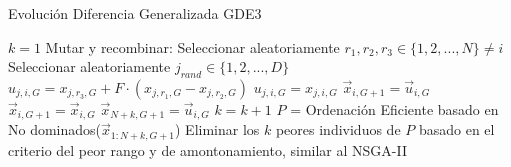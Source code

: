 \begin{algorithm}[H]
\caption{Evolución Diferencia Generalizada GDE3}
\scriptsize
\label{alg:GDE3}
\begin{scriptsize}
\begin{algorithmic}[1]
	\STATE $k=1$
    	\STATE Mutar y recombinar:
    	      \STATE Seleccionar aleatoriamente $r_1, r_2, r_3 \in \{ 1,2, ..., N \} \neq i$
    	      \STATE Seleccionar aleatoriamente $j_{rand} \in \{1, 2, ..., D \}$
    	 	       \IF{$rand_j[0,1) < CR \lor j == j_{rand}$} 
    		      		\STATE $u_{j,i, G}=x_{j,r_3, G} + F \cdot (x_{j, r_1, G} - x_{j, r_2, G})$
    	   	  	 	\ELSE
    	      			\STATE   $u_{j,i, G}= x_{j,i,G}$
    	   		   \ENDIF
    	      \ENDFOR
    	         \STATE $\vec{x}_{i, G+1 } =\vec{u}_{i,G}$ 
    	      \ELSE 
    	          \STATE $\vec{x}_{i, G+1 }= \vec{x}_{i,G}$
    	      \ENDIF
			   \STATE $\vec{x}_{N+k, G+1} = \vec{u}_{i,G}$   
				\STATE $k=k+1$
			   \ENDIF
	\ENDFOR
	\STATE $P$ = Ordenación Eficiente basado en No dominados($\vec{x}_{ 1:N+k,G+1}$)
	\STATE Eliminar los $k$ peores individuos de $P$ basado en el criterio del peor rango y de amontonamiento, similar al NSGA-II
    \ENDWHILE
\end{algorithmic}
\end{scriptsize}
\end{algorithm}

